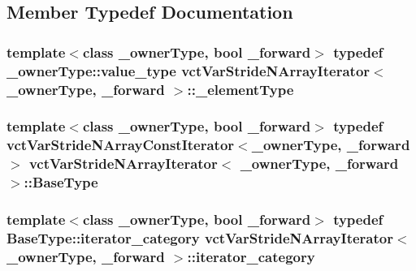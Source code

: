 \subsection{Member Typedef Documentation}
\hypertarget{classvct_var_stride_n_array_iterator_ad3f815ae11188c45c85071e5cbd7ee8d}{}
\subsubsection[{\+\_\+element\+Type}]{\setlength{\rightskip}{0pt plus 5cm}template$<$class \+\_\+owner\+Type, bool \+\_\+forward$>$ typedef \+\_\+owner\+Type\+::value\+\_\+type {\bf vct\+Var\+Stride\+N\+Array\+Iterator}$<$ \+\_\+owner\+Type, \+\_\+forward $>$\+::{\bf \+\_\+element\+Type}}\label{classvct_var_stride_n_array_iterator_ad3f815ae11188c45c85071e5cbd7ee8d}
\hypertarget{classvct_var_stride_n_array_iterator_a23f53d3764feb53f61a458e5f28a78ad}{}
\subsubsection[{Base\+Type}]{\setlength{\rightskip}{0pt plus 5cm}template$<$class \+\_\+owner\+Type, bool \+\_\+forward$>$ typedef {\bf vct\+Var\+Stride\+N\+Array\+Const\+Iterator}$<$\+\_\+owner\+Type, \+\_\+forward$>$ {\bf vct\+Var\+Stride\+N\+Array\+Iterator}$<$ \+\_\+owner\+Type, \+\_\+forward $>$\+::{\bf Base\+Type}}\label{classvct_var_stride_n_array_iterator_a23f53d3764feb53f61a458e5f28a78ad}
\hypertarget{classvct_var_stride_n_array_iterator_a914738ffb87fa950256c5fc39d4cf855}{}
\subsubsection[{iterator\+\_\+category}]{\setlength{\rightskip}{0pt plus 5cm}template$<$class \+\_\+owner\+Type, bool \+\_\+forward$>$ typedef Base\+Type\+::iterator\+\_\+category {\bf vct\+Var\+Stride\+N\+Array\+Iterator}$<$ \+\_\+owner\+Type, \+\_\+forward $>$\+::{\bf iterator\+\_\+category}}\label{classvct_var_stride_n_array_iterator_a914738ffb87fa950256c5fc39d4cf855}
\hypertarget{classvct_var_stride_n_array_iterator_ace0aaa36ae04ab580bdc4b41540f5da8}{}
